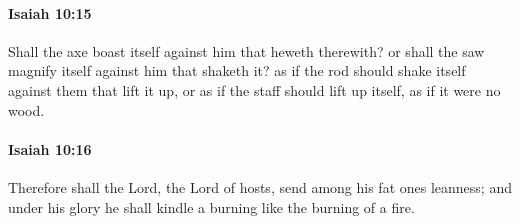 		\paragraph{Isaiah 10:15} %
			\label{ISAIAH-10-15}

			Shall the axe boast itself against him that heweth therewith? or shall the saw magnify itself against him that shaketh it? as if the rod should shake itself against them that lift it up, or as if the staff should lift up itself, as if it were no wood.


		\paragraph{Isaiah 10:16} %
			\label{ISAIAH-10-16}

			Therefore shall the Lord, the Lord of hosts, send among his fat ones leanness; and under his glory he shall kindle a burning like the burning of a fire.

